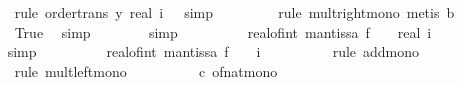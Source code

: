 \begin{isabellebody}
\ \ \ \ \ \ \ \isamarkupfalse%
\ {\isacharparenleft}{\kern0pt}rule\ order{\isacharunderscore}{\kern0pt}trans{\isacharbrackleft}{\kern0pt}\ y{\isacharequal}{\kern0pt}{\isachardoublequoteopen}{}{\isacharasterisk}{\kern0pt}\ {\isacharparenleft}{\kern0pt}real\ i\ {\isacharminus}{\kern0pt}\ {}{\isacharparenright}{\kern0pt}{\isachardoublequoteclose}{\isacharbrackright}{\kern0pt}{\isacharcomma}{\kern0pt}\ simp{\isacharparenright}{\kern0pt}\isanewline
\ \ \ \ \ \ \ \isamarkupfalse%
\ {\isacharparenleft}{\kern0pt}rule\ mult{\isacharunderscore}{\kern0pt}right{\isacharunderscore}{\kern0pt}mono{\isacharcomma}{\kern0pt}\ metis\ b{\isacharparenright}{\kern0pt}\isanewline
\ \ \ \ \ \ \ \isamarkupfalse%
\ True\ \isamarkupfalse%
\ simp\isanewline
\ \ \ \ \ \ \isamarkupfalse%
\ simp\isanewline
\ \ \ \ \isamarkupfalse%
\ \isamarkupfalse%
\ {\isachardoublequoteopen}{\isachardot}{\kern0pt}{\isachardot}{\kern0pt}{\isachardot}{\kern0pt}\ {\isacharequal}{\kern0pt}\ {\isasymbar}real{\isacharunderscore}{\kern0pt}of{\isacharunderscore}{\kern0pt}int\ {\isacharparenleft}{\kern0pt}mantissa\ f{\isacharparenright}{\kern0pt}{\isasymbar}\ {\isacharasterisk}{\kern0pt}\ {\isacharparenleft}{\kern0pt}{}\ {\isacharasterisk}{\kern0pt}\ real\ i{\isacharparenright}{\kern0pt}\ {\isacharplus}{\kern0pt}\ {}{\isachardoublequoteclose}\isanewline
\ \ \ \ \ \ \isamarkupfalse%
\ simp\isanewline
\ \ \ \ \isamarkupfalse%
\ \isamarkupfalse%
\ {\isachardoublequoteopen}{\isachardot}{\kern0pt}{\isachardot}{\kern0pt}{\isachardot}{\kern0pt}\ {\isasymle}\ {\isasymbar}real{\isacharunderscore}{\kern0pt}of{\isacharunderscore}{\kern0pt}int\ {\isacharparenleft}{\kern0pt}mantissa\ f{\isacharparenright}{\kern0pt}{\isasymbar}\ {\isacharasterisk}{\kern0pt}\ {}\ {\isacharcircum}{\kern0pt}\ i\ {\isacharplus}{\kern0pt}\ {}{\isachardoublequoteclose}\isanewline
\ \ \ \ \ \ \isamarkupfalse%
\ {\isacharparenleft}{\kern0pt}rule\ add{\isacharunderscore}{\kern0pt}mono{\isacharparenright}{\kern0pt}\isanewline
\ \ \ \ \ \ \ \isamarkupfalse%
\ {\isacharparenleft}{\kern0pt}rule\ mult{\isacharunderscore}{\kern0pt}left{\isacharunderscore}{\kern0pt}mono{\isacharparenright}{\kern0pt}\ \isanewline
\ \ \ \ \ \ \ \isamarkupfalse%
\ c\ of{\isacharunderscore}{\kern0pt}nat{\isacharunderscore}{\kern0pt}mono\ \isamarkupfalse%

\end{isabellebody}
